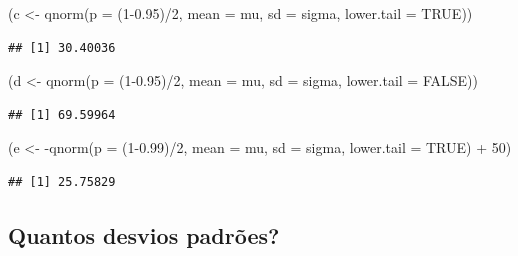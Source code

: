 \documentclass[
]{book}
\newenvironment{Shaded}{\begin{snugshade}}{\end{snugshade}}
\newcommand{\AttributeTok}[1]{\textcolor[rgb]{0.77,0.63,0.00}{#1}}
\newcommand{\ConstantTok}[1]{\textcolor[rgb]{0.00,0.00,0.00}{#1}}
\newcommand{\DecValTok}[1]{\textcolor[rgb]{0.00,0.00,0.81}{#1}}
\newcommand{\FloatTok}[1]{\textcolor[rgb]{0.00,0.00,0.81}{#1}}
\newcommand{\FunctionTok}[1]{\textcolor[rgb]{0.00,0.00,0.00}{#1}}
\newcommand{\NormalTok}[1]{#1}
\newcommand{\OtherTok}[1]{\textcolor[rgb]{0.56,0.35,0.01}{#1}}
\newcommand{\SpecialCharTok}[1]{\textcolor[rgb]{0.00,0.00,0.00}{#1}}
\begin{document}
\begin{Shaded}
\begin{Highlighting}[]
\NormalTok{(c }\OtherTok{\textless{}{-}} \FunctionTok{qnorm}\NormalTok{(}\AttributeTok{p =}\NormalTok{ (}\DecValTok{1}\FloatTok{{-}0.95}\NormalTok{)}\SpecialCharTok{/}\DecValTok{2}\NormalTok{, }\AttributeTok{mean =}\NormalTok{ mu, }\AttributeTok{sd =}\NormalTok{ sigma, }\AttributeTok{lower.tail =} \ConstantTok{TRUE}\NormalTok{))}
\end{Highlighting}
\end{Shaded}

\begin{verbatim}
## [1] 30.40036
\end{verbatim}

\begin{Shaded}
\begin{Highlighting}[]
\NormalTok{(d }\OtherTok{\textless{}{-}} \FunctionTok{qnorm}\NormalTok{(}\AttributeTok{p =}\NormalTok{ (}\DecValTok{1}\FloatTok{{-}0.95}\NormalTok{)}\SpecialCharTok{/}\DecValTok{2}\NormalTok{, }\AttributeTok{mean =}\NormalTok{ mu, }\AttributeTok{sd =}\NormalTok{ sigma, }\AttributeTok{lower.tail =} \ConstantTok{FALSE}\NormalTok{))}
\end{Highlighting}
\end{Shaded}

\begin{verbatim}
## [1] 69.59964
\end{verbatim}

\begin{Shaded}
\begin{Highlighting}[]
\NormalTok{(e }\OtherTok{\textless{}{-}} \SpecialCharTok{{-}}\FunctionTok{qnorm}\NormalTok{(}\AttributeTok{p =}\NormalTok{ (}\DecValTok{1}\FloatTok{{-}0.99}\NormalTok{)}\SpecialCharTok{/}\DecValTok{2}\NormalTok{, }\AttributeTok{mean =}\NormalTok{ mu, }\AttributeTok{sd =}\NormalTok{ sigma, }\AttributeTok{lower.tail =} \ConstantTok{TRUE}\NormalTok{) }\SpecialCharTok{+} \DecValTok{50}\NormalTok{)}
\end{Highlighting}
\end{Shaded}

\begin{verbatim}
## [1] 25.75829
\end{verbatim}

\hypertarget{quantos-desvios-padruxf5es}{%
\subsection{Quantos desvios padrões?}\label{quantos-desvios-padruxf5es}}
\end{document}
